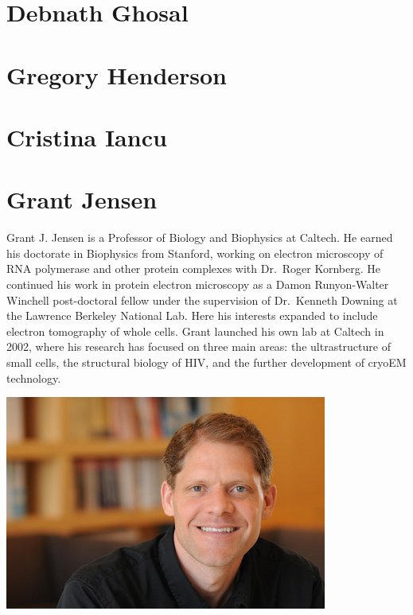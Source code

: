 \documentclass[]{tufte-book}
\begin{document}
\hypertarget{debnath_ghosal}{%
\section*{Debnath Ghosal}\label{debnath_ghosal}}

\hypertarget{gregory_henderson}{%
\section*{Gregory Henderson}\label{gregory_henderson}}

\hypertarget{cristina_iancu}{%
\section*{Cristina Iancu}\label{cristina_iancu}}

\hypertarget{grant_jensen}{%
\section*{Grant Jensen}\label{grant_jensen}}

Grant J. Jensen is a Professor of Biology and Biophysics at Caltech. He earned his doctorate in Biophysics from Stanford, working on electron microscopy of RNA polymerase and other protein complexes with Dr.~Roger Kornberg. He continued his work in protein electron microscopy as a Damon Runyon-Walter Winchell post-doctoral fellow under the supervision of Dr.~Kenneth Downing at the Lawrence Berkeley National Lab. Here his interests expanded to include electron tomography of whole cells. Grant launched his own lab at Caltech in 2002, where his research has focused on three main areas: the ultrastructure of small cells, the structural biology of HIV, and the further development of cryoEM technology.

\includegraphics{img/bios/grant_jensen}
\end{document}
